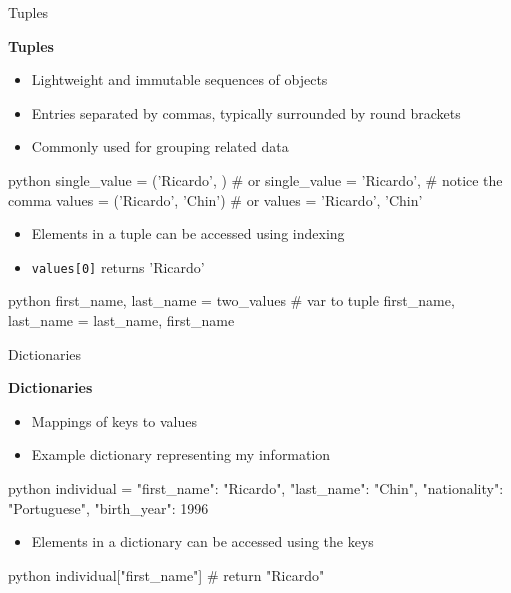 \documentclass[
	11pt, 
]{beamer}
\begin{document}

\begin{frame}[fragile]{Tuples}

\textbf{Tuples}

\begin{itemize}
    \item Lightweight and immutable sequences of objects
    \item Entries separated by commas, typically surrounded by round brackets
    \item Commonly used for grouping related data
\end{itemize}

\begin{mintedbox}{python}
single_value = ('Ricardo', ) # or
single_value = 'Ricardo', # notice the comma
values = ('Ricardo', 'Chin') # or
values = 'Ricardo', 'Chin'
\end{mintedbox}

\begin{itemize}
    \item Elements in a tuple can be accessed using indexing
    \item \texttt{values[0]} returns 'Ricardo'
\end{itemize}

\begin{mintedbox}{python}
first_name, last_name = two_values # var to tuple
first_name, last_name = last_name, first_name
\end{mintedbox}

\end{frame}


\begin{frame}[fragile]{Dictionaries}

\textbf{Dictionaries}

\begin{itemize}
    \item Mappings of keys to values
    \item Example dictionary representing my information
\end{itemize}

\begin{mintedbox}{python}
individual = {
    "first_name": "Ricardo",
    "last_name": "Chin",
    "nationality": "Portuguese",
    "birth_year": 1996
}
\end{mintedbox}

\begin{itemize}
    \item Elements in a dictionary can be accessed using the keys
\end{itemize}

\begin{mintedbox}{python}
individual["first_name"]  # return "Ricardo"
\end{mintedbox}

\end{frame}
\end{document}
